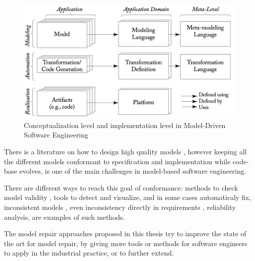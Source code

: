 \begin{figure}[!htb]
	\centering
	\includegraphics[width=.8\columnwidth]{mdse.png}
	\caption{Conceptualization level and implementation level in Model-Driven Software Engineering}
	\label{fig:mdse}
\end{figure}

There is a literature on how to design high quality models \cite{Krogstie:2012:MDE:2331118}, however keeping all the different models conformant to specification and implementation while code-base evolves, is one of the main challenges in model-based software engineering.

There are different ways to reach this goal of conformance: methods to check model validity \cite{parizek2006model,arcaini2018modelling}, tools to detect and visualize, and in some cases automaticaly fix, inconsistent models \cite{egyed_scenario-driven_2003,egyed_fixing_2007,egyed_scalable_2001}, even inconsistency directly in requirements \cite{egyed_identifying_2004,egyed_automating_2002}, reliability analysis, are examples of such methods.

The model repair approaches proposed in this thesis try to improve the state of the art for model repair, by giving more tools or methods for software engineers to apply in the industrial practice, or to further extend.




